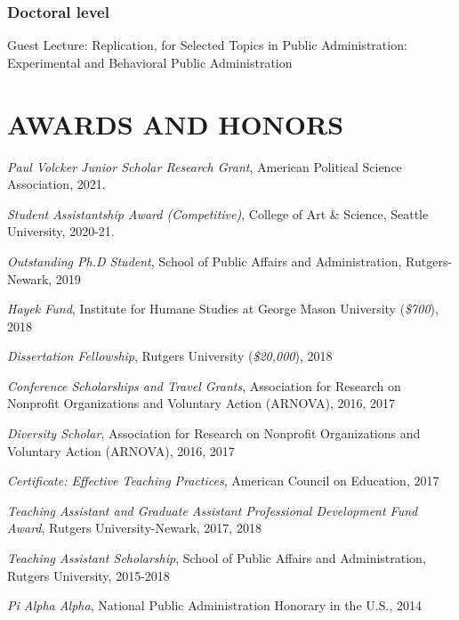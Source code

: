 \documentclass[letterpaper]{article}
\renewenvironment{itemize}{
  \begin{list}{}{
    \setlength{\leftmargin}{1.5em}
  }
}{
  \end{list}
}
\begin{document}
\subsubsection*{Doctoral level}
\begin{itemize}	
\item Guest Lecture: Replication, for Selected Topics in Public Administration: Experimental and Behavioral Public Administration
\end{itemize}

\bigskip


\section*{AWARDS AND HONORS}
\begin{itemize}

\item {\it Paul Volcker Junior Scholar Research Grant}, American Political Science Association, 2021.
	
\item {\it Student Assistantship Award (Competitive)}, College of Art \& Science, Seattle University, 2020-21. 
	
\item {\it Outstanding Ph.D Student}, School of Public Affairs and Administration, Rutgers-Newark, 2019

\item {\it Hayek Fund}, Institute for Humane Studies at George Mason University ({\it \$700}), 2018

\item {\it Dissertation Fellowship}, Rutgers University ({\it \$20,000}), 2018

\item {\it Conference Scholarships and Travel Grants}, Association for Research on Nonprofit Organizations and Voluntary Action (ARNOVA), 2016, 2017

\item {\it Diversity Scholar}, Association for Research on Nonprofit Organizations and Voluntary Action (ARNOVA), 2016, 2017

\item {\it Certificate: Effective Teaching Practices}, American Council on Education, 2017

\item {\it Teaching Assistant and Graduate Assistant Professional Development Fund Award}, Rutgers University-Newark, 2017, 2018

\item {\it Teaching Assistant Scholarship}, School of Public Affairs and Administration, Rutgers University, 2015-2018

\item {\it Pi Alpha Alpha}, National Public Administration Honorary in the U.S., 2014

\end{itemize}
\end{document}
